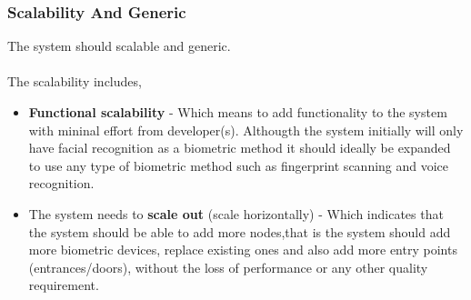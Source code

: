 \subsubsection{Scalability And Generic}
The system should scalable and generic.\\
\\The scalability includes,
\begin{itemize}
	\item  \textbf{Functional scalability} - Which means to add functionality to the system with mininal effort from developer(s).
		Althougth the system initially will only have facial recognition as a biometric method it should ideally be expanded to use 				any type of biometric method such as fingerprint scanning and voice recognition.
	\item  The system needs to \textbf{scale out} (scale horizontally) - Which indicates that the system should be able to add more nodes,that 		is the system should add more biometric devices, replace existing ones and also add more entry points (entrances/doors), 			without the loss of performance or any other quality requirement.
\end{itemize}





